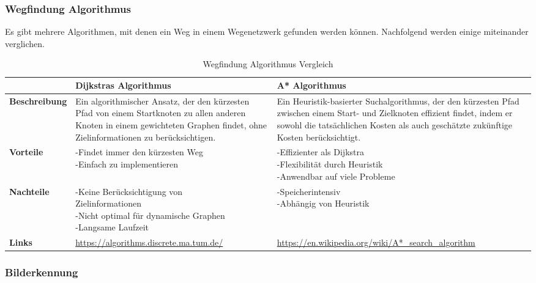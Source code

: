 \subsubsection{Wegfindung Algorithmus}

Es gibt mehrere Algorithmen, mit denen ein Weg in einem Wegenetzwerk gefunden werden können. Nachfolgend werden einige miteinander verglichen.


\begin{table}[H]
\centering
\small
\begin{tabularx}{\textwidth}{|l|X|X|}
\hline
\textbf{} & \textbf{Dijkstras Algorithmus} & \textbf{A* Algorithmus}\\
  \hline
  \textbf{Beschreibung} & Ein algorithmischer Ansatz, der den kürzesten Pfad von einem Startknoten zu allen anderen Knoten in einem gewichteten Graphen findet, ohne Zielinformationen zu berücksichtigen. & Ein Heuristik-basierter Suchalgorithmus, der den kürzesten Pfad zwischen einem Start- und Zielknoten effizient findet, indem er sowohl die tatsächlichen Kosten als auch geschätzte zukünftige Kosten berücksichtigt. \\
  \hline
  \textbf{Vorteile}  & \makecell{-Findet immer den kürzesten Weg \\ -Einfach zu implementieren} & \makecell{-Effizienter als Dijkstra \\ -Flexibilität durch Heuristik \\ -Anwendbar auf viele Probleme}\\
  \hline
  \textbf{Nachteile} & \makecell{-Keine Berücksichtigung von \\ Zielinformationen \\ -Nicht optimal für dynamische Graphen \\ -Langsame Laufzeit} & \makecell{-Speicherintensiv \\-Abhängig von Heuristik}\\
  \hline
  \textbf{Links} & \url{https://algorithms.discrete.ma.tum.de/}  & \url{https://en.wikipedia.org/wiki/A*_search_algorithm} \\
  \hline
\end{tabularx}
\caption{Wegfindung Algorithmus Vergleich}
\label{table:path-algo-compare}
\end{table}

\newpage

\subsubsection{Bilderkennung}


